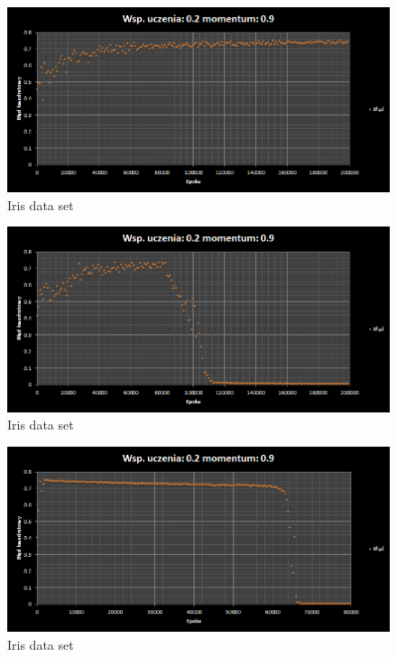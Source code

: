 \documentclass{classrep}
\begin{document}
\begin{figure}[ht]
\centering
			\includegraphics[scale=0.65]{pictures/Iris01.png}
	\caption{Iris data set}
	\label{fig:Iris data set}
\end{figure}

\begin{figure}[ht]
\centering
			\includegraphics[scale=0.65]{pictures/Iris02.png}
	\caption{Iris data set}
	\label{fig:Iris data set}
\end{figure}

\begin{figure}[ht]
\centering
			\includegraphics[scale=0.65]{pictures/Iris03.png}
	\caption{Iris data set}
	\label{fig:Iris data set}
\end{figure}
\end{document}
